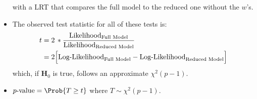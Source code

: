 \begin{itemize}
\begin{tightcenter}
          \end{tightcenter}
          with a LRT that compares the full model to the reduced one without the $ w $'s.
    \item The observed test statistic for all of these tests is:
          \begin{align*}
              t & =2\,\log*{\frac{\text{Likelihood}_{\text{Full Model}}}{\text{Likelihood}_{\text{Reduced Model}}}}    \\
                & =2\Bigl[\text{Log-Likelihood}_{\text{Full Model}}-\text{Log-Likelihood}_{\text{Reduced Model}}\Bigr]
          \end{align*}
          which, if $ \mathbf{H}_0 $ is true, follows an approximate $ \chi^2(p-1) $.
    \item $ p\text{-value}=\Prob{T\ge t} $ where $ T \sim \chi^2(p-1) $.
\end{itemize}
